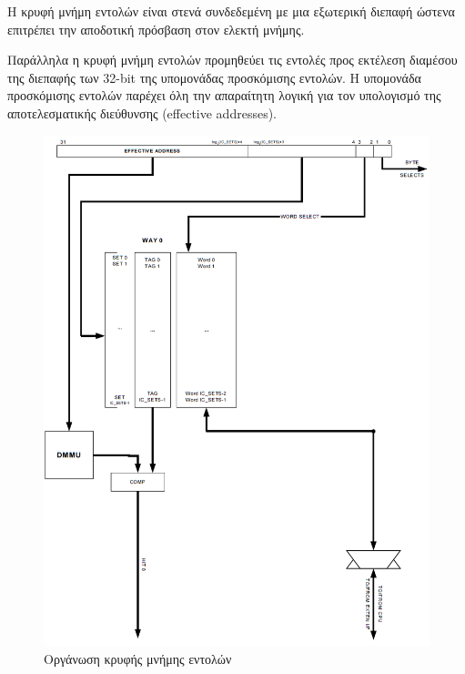 \documentclass[a4paper,10pt]{article}
\numberwithin{figure}{subsection}
\numberwithin{table}{subsection}
\begin{document}
{Η κρυφή μνήμη εντολών είναι στενά συνδεδεμένη με μια εξωτερική διεπαφή ώστενα επιτρέπει την αποδοτική
πρόσβαση στον ελεκτή μνήμης.
\newline

Παράλληλα η κρυφή μνήμη εντολών προμηθεύει τις εντολές προς εκτέλεση διαμέσου
της διεπαφής των 32-bit της υπομονάδας προσκόμισης εντολών. Η υπομονάδα προσκόμισης εντολών
 παρέχει όλη την απαραίτητη λογική για
τον υπολογισμό της αποτελεσματικής διεύθυνσης (effective addresses).

\vspace{0.7cm}
\begin{figure}[h!]
 \centering
 \includegraphics[bb=0 0 908 1201,scale=0.38]{./Images/instruction_cache.png}
 \caption{Οργάνωση κρυφής μνήμης εντολών}
\end{figure}
\vspace{0.7cm}



}
\end{document}
